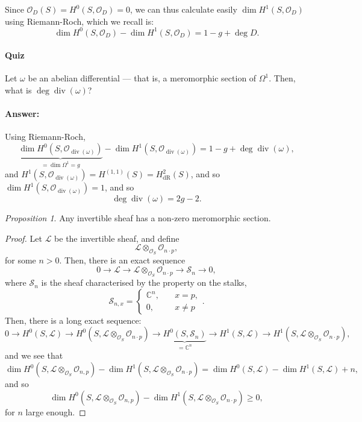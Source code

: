 \documentclass[a4paper]{report}
\theoremstyle{definition}
\theoremstyle{remark}
\theoremstyle{proposition}
\newtheorem{proposition}{Proposition}
\theoremstyle{conjecture}
\theoremstyle{lemma}
\theoremstyle{corollary}
\theoremstyle{exercise}
\theoremstyle{example}
\newcommand{\C}{\mathbb{C}}
\newcommand{\mcal}{\mathcal}
\newcommand{\on}{\operatorname}
\begin{document}
Since $\mcal{O}_D(S) = H^0(S,\mcal{O}_D) = 0$, we can thus calculate
easily $\dim H^1(S,\mcal{O}_D)$ using Riemann-Roch, which we recall is:
$$\dim H^0(S,\mcal{O}_D) - \dim H^1(S,\mcal{O}_D) = 1-g + \deg D.$$

\paragraph{Quiz} Let $\omega$ be an abelian differential --- that is, a 
meromorphic section of $\Omega^1$. Then, what is $\deg\on{div}(\omega)$?
\paragraph{Answer:} Using Riemann-Roch,
$$\underbrace{\dim H^0(S,\mcal{O}_{\on{div}(\omega)})}_{=\dim \Omega^1=g} -  \dim H^1(S,\mcal{O}_{\on{div}(\omega)}) = 1-g + \deg\on{div}(\omega),$$
and $H^1(S,\mcal{O}_{\on{div}(\omega)}) = H^{(1,1)}(S) = H^2_{\on{dR}}(S)$, and so $\dim H^1(S,\mcal{O}_{\on{div}(\omega)}) = 1$, 
and so $$\deg\on{div}(\omega)=  2g-2.$$

\begin{proposition}
    Any invertible sheaf has a non-zero meromorphic section.
\end{proposition}

\begin{proof}
    Let $\mcal{L}$ be the invertible sheaf, and define 
    $$\mcal{L}\otimes_{\mcal{O}_S} \mcal{O}_{n\cdot p},$$
    for some $n > 0$. 
    Then, there is an exact sequence
    $$0 \longrightarrow \mcal{L} \longrightarrow \mcal{L}\otimes_{\mcal{O}_S}\mcal{O}_{n\cdot p} \longrightarrow \mcal{S}_n\longrightarrow 0,$$
    where $\mcal{S}_n$ is the sheaf characterised by the property 
    on the stalks, $$\mcal{S}_{n,x} = \begin{cases}
        \C^n, \quad &x=p,\\
        0, \quad &x\neq p
    \end{cases}.$$
    Then, there is a long exact sequence:
    $$0 \longrightarrow H^0(S,\mcal{L}) \longrightarrow H^0(S,\mcal{L}\otimes_{\mcal{O}_S} \mcal{O}_{n\cdot p}) \longrightarrow \underbrace{H^0(S,\mcal{S}_n)}_{= \C^n} \longrightarrow H^1(S,\mcal{L}) \longrightarrow H^1(S,\mcal{L}\otimes_{\mcal{O}_S} \mcal{O}_{n\cdot p}),$$
    and we see that 
    $$\dim H^0(S,\mcal{L}\otimes_{\mcal{O}_S} \mcal{O}_{n,p}) - \dim H^1(S,\mcal{L}\otimes_{\mcal{O}_S} \mcal{O}_{n\cdot p}) = \dim H^0(S,\mcal{L}) - \dim H^1(S,\mcal{L}) + n,$$
    and so 
    $$\dim H^0(S,\mcal{L}\otimes_{\mcal{O}_S} \mcal{O}_{n,p}) - \dim H^1(S,\mcal{L}\otimes_{\mcal{O}_S} \mcal{O}_{n\cdot p}) \geq 0,$$
    for $n$ large enough.

\end{proof}
\end{document}
